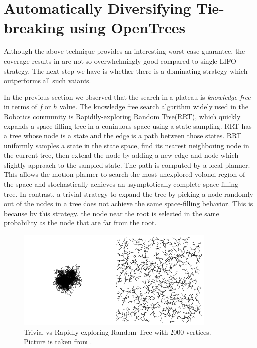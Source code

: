 \section{Automatically Diversifying Tie-breaking using OpenTrees}

Although the above technique provides an interesting worst case guarantee, the coverage results in  are not so overwhelmingly good compared to single LIFO strategy. The next step we have is whether there is a dominating strategy which outperforms all such vaiants.

In the previous section we observed that the search in a plateau is \emph{knowledge free} in terms of $f$ or $h$ value. The \sota knowledge free search algorithm widely used in the Robotics community is Rapidily-exploring Random Tree(RRT), which quickly expands a space-filling tree in a coninuous space using a state sampling.  RRT has a tree whose node is a state and the edge is a path between those states.
RRT uniformly samples a state in the state space, find its nearest neighboring node in the current tree, then extend the node by adding a new edge and node which slightly approach to the sampled state. The path is computed by a local planner.
This allows the motion planner to search the most unexplored volonoi region of the space and stochastically achieves an asymptotically complete space-filling tree.
In contrast, a trivial strategy to expand the tree by picking a node randomly out of the nodes in a tree does not achieve the same space-filling behavior. This is because by this strategy, the node near the root is selected in the same probability as the node that are far from the root.

\begin{figure}[htbp]
 \centering
 \includegraphics{img/static/trivial-vs-rrt.png}
 \caption{Trivial vs Rapidly exploring Random Tree with 2000 vertices. Picture is taken from \cite{lavalle2001randomized}.}
 \label{rrt}
\end{figure}

